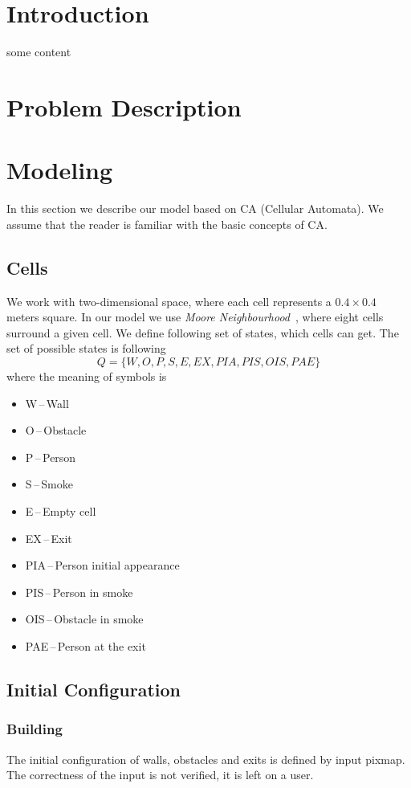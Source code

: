 \section{Introduction}
some content~\cite{CaEvac}

\section{Problem Description}

\section{Modeling}
In this section we describe our model based on CA (Cellular Automata). We
assume that the reader is familiar with the basic concepts of CA.

\subsection{Cells}
We work with two-dimensional space, where each cell represents a $0.4 \times
0.4$ meters square. In our model we use \emph{Moore
Neighbourhood}~\cite{Moore}, where eight cells surround a given cell. We define
following set of states, which cells can get. The set of possible states is
following $$Q = \{W,O,P,S,E,EX,PIA,PIS,OIS,PAE\}$$ where the meaning of symbols
is
\begin{itemize}
    \item W\,--\,Wall
    \item O\,--\,Obstacle
    \item P\,--\,Person
    \item S\,--\,Smoke
    \item E\,--\,Empty cell
    \item EX\,--\,Exit
    \item PIA\,--\,Person initial appearance
    \item PIS\,--\,Person in smoke
    \item OIS\,--\,Obstacle in smoke
    \item PAE\,--\,Person at the exit
\end{itemize}

\subsection{Initial Configuration}
\subsubsection{Building}
The initial configuration of walls, obstacles and exits is defined by input
pixmap. The correctness  of the input is not verified, it is left on a user.
